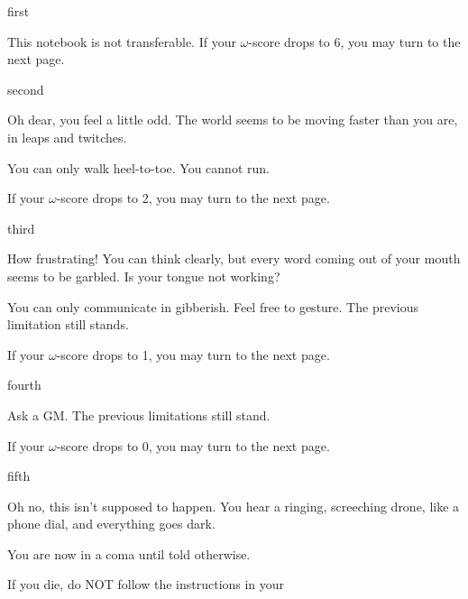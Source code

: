 \documentclass[greennotebook]{guildcamp1} %
\begin{document}
\startnotebook{\nVirus{}}



\begin{page}{first}

This notebook is not transferable. If your $\omega$-score drops to 6, you may turn to the next page.

\end{page}


\begin{page}{second}

Oh dear, you feel a little odd. The world seems to be moving faster than you are, in leaps and twitches.

You can only walk heel-to-toe. You cannot run.

If your $\omega$-score drops to 2, you may turn to the next page.

\end{page}



\begin{page}{third}

How frustrating! You can think clearly, but every word coming out of your mouth seems to be garbled. Is your tongue not working?

You can only communicate in gibberish. Feel free to gesture. The previous limitation still stands.

If your $\omega$-score drops to 1, you may turn to the next page.

\end{page}



\begin{page}{fourth}

Ask a GM.
The previous limitations still stand. 

If your $\omega$-score drops to 0, you may turn to the next page.

\end{page}



\begin{page}{fifth}

Oh no, this isn't supposed to happen. You hear a ringing, screeching drone, like a phone dial, and everything goes dark.

You are now in a coma until told otherwise.

If you die, do NOT follow the instructions in your %

\end{page}



\endnotebook
\end{document}
